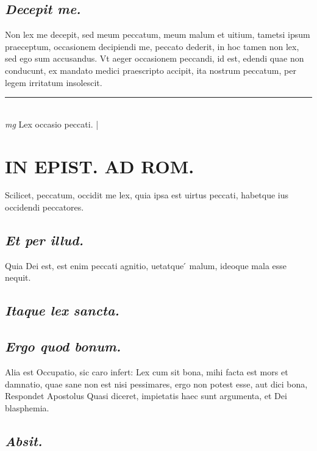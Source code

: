 \documentclass{article}
\begin{document}
\begin{pages}
\subsection*{\textit{Decepit me. }}\pstart Non lex me decepit, sed meum peccatum, meum malum et uitium, tametsi ipsum praeceptum, occasionem decipiendi me, peccato dederit, in hoc tamen non lex, sed ego sum accusandus. Vt aeger occasionem peccandi, id est, edendi quae non conducunt, ex mandato medici praescripto accipit, ita nostrum peccatum, per legem irritatum insolescit.   \pend
\vspace{0.5cm}\noindent
\vspace{0.2cm}\rule{1cm}{0.2pt}\\ 
\hspace{0.2cm}\textit{mg}
\footnotesize Lex occasio peccati.  
\normalsize| 
\section*{IN EPIST. AD ROM.  }
\marginpar{[ p.70 ]}\pstart Scilicet, peccatum, occidit me lex, quia ipsa est uirtus peccati, habetque ius occidendi peccatores.   \pend
{}
{}
\subsection*{\textit{Et per illud. }}\pstart Quia Dei est, est enim peccati agnitio, uetatque ́ malum, ideoque mala esse nequit.   \pend
{}
{}
\subsection*{\textit{Itaque lex sancta. }}
{}
\subsection*{\textit{Ergo quod bonum. }}\pstart Alia est Occupatio, sic caro infert: Lex cum sit bona, mihi facta est mors et damnatio, quae sane non est nisi pessimares, ergo non potest esse, aut dici bona, Respondet Apostolus  \pend\pstart Quasi diceret, impietatis haec sunt argumenta, et Dei blasphemia.   \pend
{}
{}
\subsection*{\textit{Absit. }}
{}

\end{pages}
\end{document}
